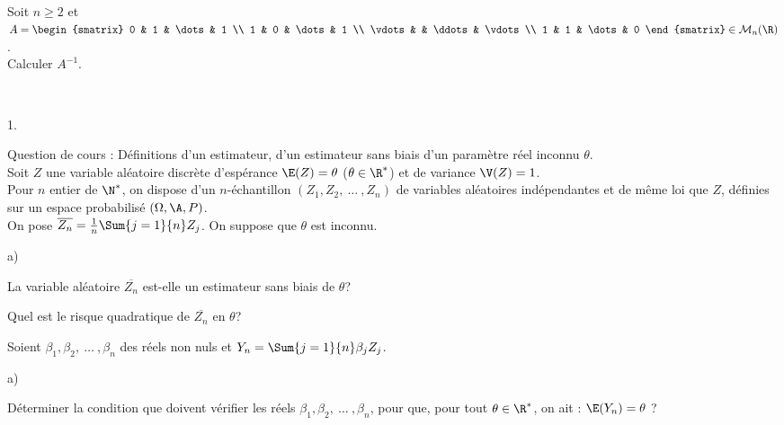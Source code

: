 \documentclass[11pt]{article}%
\begin{document}
\begin{exerciceSP}~\\
  Soit $n \geq 2$ et $A = 
  \begin{smatrix} 
    0 & 1 & \dots & 1 \\ 
    1 & 0 & \dots & 1 \\ 
    \vdots & & \ddots & \vdots \\ 
    1 & 1 & \dots & 0
  \end{smatrix} \in \mathcal{M}_n(\R)$.
  \\[.2cm]
  Calculer $A^{-1}$.
\end{exerciceSP}




\begin{exerciceAP}~
  \begin{noliste}{1.}
    \setlength{\itemsep}{2mm}
  \item Question de cours : Définitions d'un estimateur, d'un
    estimateur sans biais d'un paramètre réel inconnu $\theta$.
    \\[.2cm]
    Soit $Z$ une variable aléatoire discrète d'espérance $\E(Z) =
    \theta$ ($\theta \in \R^*$) et de variance $\V(Z) = 1$.
    \\[.2cm]
    Pour $n$ entier de $\N^*$, on dispose d'un $n$-échantillon $(Z_1 ,
    Z_2 ,\ \dots\ , Z_n)$ de variables aléatoires indépendantes et de
    même loi que $Z$, définies sur un espace probabilisé $(\Omega , \A
    , P)$.
    \\[.2cm]
    On pose $\overline{Z_n} = \frac{1}{n} \Sum{j=1}{n} Z_j$. On
    suppose que $\theta$ est inconnu.
  \item \begin{noliste}{a)}
    \setlength{\itemsep}{2mm} \item La variable aléatoire
      $\overline{Z_n}$ est-elle un estimateur sans biais de $\theta$?
    \item Quel est le risque quadratique de $\overline{Z_n}$ en
      $\theta$?
    \end{noliste}
  \item Soient $\beta_1, \beta_2,\ \dots\ , \beta_n$ des réels non
    nuls et $Y_n = \Sum{j=1}{n} \beta_j Z_j$.
    \begin{noliste}{a)}
    \setlength{\itemsep}{2mm}
    \item Déterminer la condition que doivent vérifier les réels
      $\beta_1, \beta_2,\ \dots\ , \beta_n$, pour que, pour tout
      $\theta \in \R^*$, on ait : $\E(Y_n) = \theta$ ?
      \\[.2cm]

\end{noliste}
\end{noliste}
\end{exerciceAP}
\end{document}
